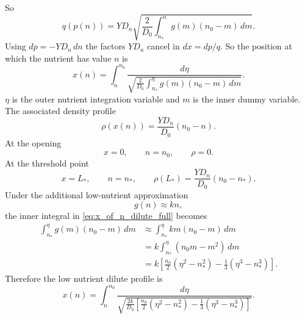 \documentclass[11pt,a4paper]{report}
\begin{document}
So
\[
q(p(n))
=
YD_n
\sqrt{
	\frac{2}{D_0}
	\int_{n_*}^{n}g(m)(n_0-m)\,dm
}.
\]
Using $dp=-YD_n\,dn$ the factors $YD_n$ cancel in $dx=dp/q$. So
the position at which the nutrient has value $n$ is
\begin{equation}
	{
		x(n)
		=
		\int_n^{n_0}
		\frac{d\eta}
		{
			\sqrt{
				\frac{2}{D_0}
				\int_{n_*}^{\eta}
				g(m)(n_0-m)\,dm
			}
		}.
	}
	\label{eq:x_of_n_dilute_full}
\end{equation}
$\eta$ is the outer nutrient integration variable and $m$ is the
inner dummy variable.\\
The associated density profile
\begin{equation}
	{
		\rho(x(n))
		=
		\frac{YD_n}{D_0}(n_0-n).
	}
	\label{eq:rho_of_n_dilute_full}
\end{equation}
At the opening
\[
x=0,
\qquad
n=n_0,
\qquad
\rho=0.
\]
At the threshold point
\[
x=L_*,
\qquad
n=n_*,
\qquad
\rho(L_*)=
\frac{YD_n}{D_0}(n_0-n_*).
\]	
Under the additional low-nutrient approximation
\[
g(n)\approx kn,
\]
the inner integral in \eqref{eq:x_of_n_dilute_full} becomes
\begin{align}
	\int_{n_*}^{\eta} g(m)(n_0-m)\,dm
	&\approx
	\int_{n_*}^{\eta} k m(n_0-m)\,dm \\
	&=
	k\int_{n_*}^{\eta}(n_0m-m^2)\,dm \\
	&=
	k\left[
	\frac{n_0}{2}(\eta^2-n_*^2)
	-
	\frac{1}{3}(\eta^3-n_*^3)
	\right].
\end{align}
Therefore the low nutrient dilute profile is
\begin{equation}
	{
		x(n)
		=
		\int_n^{n_0}
		\frac{d\eta}
		{
			\sqrt{
				\frac{2k}{D_0}
				\left[
				\frac{n_0}{2}(\eta^2-n_*^2)
				-
				\frac{1}{3}(\eta^3-n_*^3)
				\right]
			}
		}.
	}
	\label{eq:x_of_n_dilute_linear}
\end{equation}
\end{document}
